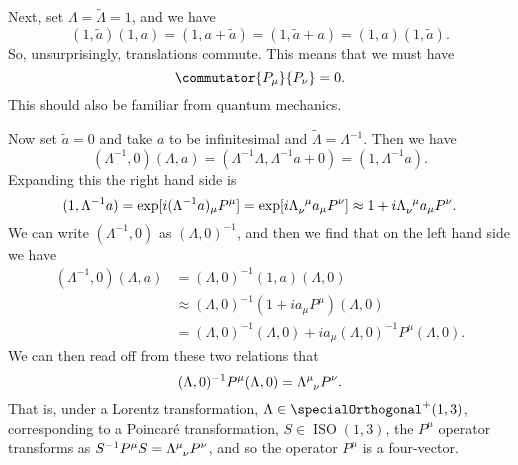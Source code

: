 \documentclass[fleqn]{NotesClass}
\newcommand{\ident}{1}
\DeclareMathOperator{\ISO}{ISO}
\begin{document}
    Next, set \(\Lambda = \tilde{\Lambda} = \ident\), and we have
    \begin{equation}
        (\ident, \tilde{a})(\ident, a) = (\ident, a + \tilde{a}) = (\ident, \tilde{a} + a) = (\ident, a)(\ident, \tilde{a}).
    \end{equation}
    So, unsurprisingly, translations commute.
    This means that we must have
    \begin{equation}
        \commutator{P_\mu}{P_\nu} = 0.
    \end{equation}
    This should also be familiar from quantum mechanics.
    
    Now set \(\tilde{a} = 0\) and take \(a\) to be infinitesimal and \(\tilde{\Lambda} = \Lambda^{-1}\).
    Then we have
    \begin{equation}
        (\Lambda^{-1}, 0)(\Lambda, a) = (\Lambda^{-1}\Lambda, \Lambda^{-1}a + 0) = (\ident, \Lambda^{-1}a).
    \end{equation}
    Expanding this the right hand side is
    \begin{equation}
        (\ident, \Lambda^{-1}a) = \exp[i(\Lambda^{-1}a)_\mu P^\mu] = \exp[i\tensor{\Lambda}{_\nu^\mu}a_\mu P^\nu] \approx 1 + i\tensor{\Lambda}{_\nu^\mu} a_\mu P^\nu.
    \end{equation}
    We can write \((\Lambda^{-1}, 0)\) as \((\Lambda, 0)^{-1}\), and then we find that on the left hand side we have
    \begin{align}
        (\Lambda^{-1}, 0)(\Lambda, a) &= (\Lambda, 0)^{-1}(\ident, a)(\Lambda, 0)\\
        &\approx (\Lambda, 0)^{-1}(1 + ia_\mu P^\mu)(\Lambda, 0)\\
        &= (\Lambda, 0)^{-1}(\Lambda, 0) + ia_\mu (\Lambda, 0)^{-1}P^\mu(\Lambda, 0).
    \end{align}
    We can then read off from these two relations that
    \begin{equation}
        (\Lambda, 0)^{-1}P^\mu(\Lambda, 0) = \tensor{\Lambda}{^\mu_\nu}P^\nu.
    \end{equation}
    That is, under a Lorentz transformation, \(\Lambda \in \specialOrthogonal^+(1, 3)\), corresponding to a Poincar\'e transformation, \(S \in \ISO(1, 3)\), the \(P^\mu\) operator transforms as \(S^{-1}P^\mu S = \tensor{\Lambda}{^\mu_\nu}P^\nu\), and so the operator \(P^\mu\) is a four-vector.
    
\end{document}
